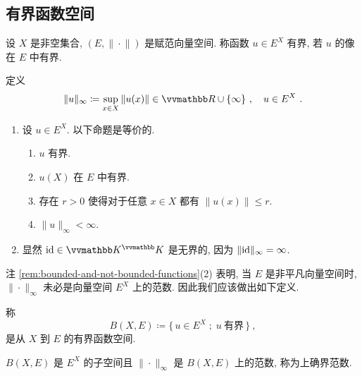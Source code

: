 \subsection{有界函数空间}

\begin{definition}[有界函数]
    设 \(X\) 是非空集合, \((E, \|\!\cdot\!\|)\) 是赋范向量空间. 称函数 \(u \in E^X\) 有界, 若 \(u\) 的像在 \(E\) 中有界.
\end{definition}

\begin{remark}\label{rem:bounded-and-not-bounded-functions}
    定义
    \[
        \|u\|_\infty \coloneqq \sup_{x \in X} \|u(x)\| \in \R \cup \{\infty\}\ ,\quad u \in E^X\ .
    \]
    \begin{enumerate}
        \item 设 \(u \in E^X\). 以下命题是等价的.
        \begin{enumerate}
            \item \(u\) 有界.
            \item \(u(X)\) 在 \(E\) 中有界.
            \item 存在 \(r > 0\) 使得对于任意 \(x \in X\) 都有 \(\|u(x)\| \leq r\).
            \item \(\|u\|_\infty < \infty\).
        \end{enumerate}
        \item 显然 \(\id \in \K^\K\) 是无界的, 因为 \(\|\!\operatorname{id}\!\|_\infty = \infty\).
    \end{enumerate}
\end{remark}

注 \ref{rem:bounded-and-not-bounded-functions}(2) 表明, 当 \(E\) 是非平凡向量空间时, \(\|\!\cdot\!\|_\infty\) 未必是向量空间 \(E^X\) 上的范数. 因此我们应该做出如下定义.

\begin{definition}[有界函数空间]
    称
    \[
        B(X, E) \coloneqq \{\, u \in E^X \;;\; u\ \text{有界} \,\}\ ,
    \]
    是从 \(X\) 到 \(E\) 的有界函数空间.
\end{definition}

\begin{proposition}\label{prop:bounded-function-space-is-normed-space}
    \(B(X, E)\) 是 \(E^X\) 的子空间且 \(\|\!\cdot\!\|_\infty\) 是 \(B(X, E)\) 上的范数, 称为上确界范数.
\end{proposition}


